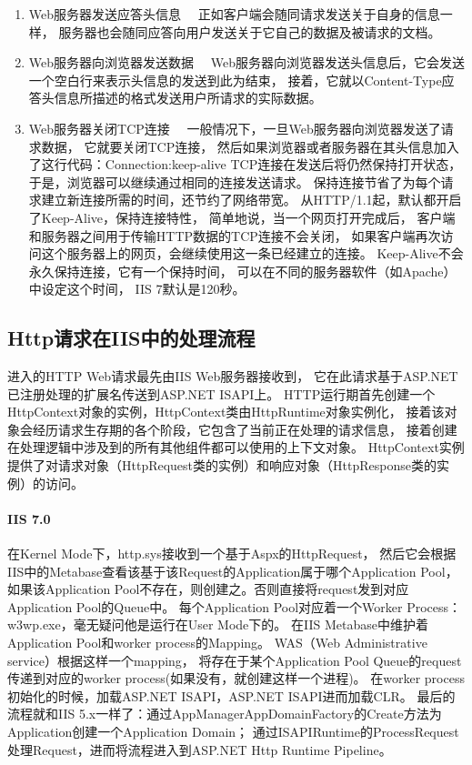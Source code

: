 \documentclass{book}
\begin{document}
\begin{enumerate}
\item{Web服务器发送应答头信息}~~
正如客户端会随同请求发送关于自身的信息一样，
服务器也会随同应答向用户发送关于它自己的数据及被请求的文档。

\item{Web服务器向浏览器发送数据}~~
Web服务器向浏览器发送头信息后，它会发送一个空白行来表示头信息的发送到此为结束，
接着，它就以Content-Type应答头信息所描述的格式发送用户所请求的实际数据。

\item{Web服务器关闭TCP连接}~~
一般情况下，一旦Web服务器向浏览器发送了请求数据，
它就要关闭TCP连接，
然后如果浏览器或者服务器在其头信息加入了这行代码：Connection:keep-alive
TCP连接在发送后将仍然保持打开状态，于是，浏览器可以继续通过相同的连接发送请求。
保持连接节省了为每个请求建立新连接所需的时间，还节约了网络带宽。
从HTTP/1.1起，默认都开启了Keep-Alive，保持连接特性，
简单地说，当一个网页打开完成后，
客户端和服务器之间用于传输HTTP数据的TCP连接不会关闭，
如果客户端再次访问这个服务器上的网页，会继续使用这一条已经建立的连接。
Keep-Alive不会永久保持连接，它有一个保持时间，
可以在不同的服务器软件（如Apache）中设定这个时间，
IIS 7默认是120秒。
\end{enumerate}


\subsection{Http请求在IIS中的处理流程}

进入的HTTP Web请求最先由IIS Web服务器接收到，
它在此请求基于ASP.NET已注册处理的扩展名传送到ASP.NET ISAPI上。
HTTP运行期首先创建一个HttpContext对象的实例，HttpContext类由HttpRuntime对象实例化，
接着该对象会经历请求生存期的各个阶段，它包含了当前正在处理的请求信息，
接着创建在处理逻辑中涉及到的所有其他组件都可以使用的上下文对象。
HttpContext实例提供了对请求对象（HttpRequest类的实例）和响应对象（HttpResponse类的实例）的访问。

\paragraph{IIS 7.0}
在Kernel Mode下，http.sys接收到一个基于Aspx的HttpRequest，
然后它会根据IIS中的Metabase查看该基于该Request的Application属于哪个Application Pool，
如果该Application Pool不存在，则创建之。否则直接将request发到对应Application Pool的Queue中。
每个Application Pool对应着一个Worker Process：w3wp.exe，毫无疑问他是运行在User Mode下的。
在IIS Metabase中维护着Application Pool和worker process的Mapping。
WAS（Web Administrative service）根据这样一个mapping，
将存在于某个Application Pool Queue的request 传递到对应的worker process(如果没有，就创建这样一个进程)。
在worker process初始化的时候，加载ASP.NET ISAPI，ASP.NET ISAPI进而加载CLR。
最后的流程就和IIS 5.x一样了：通过AppManagerAppDomainFactory的Create方法为Application创建一个Application Domain；
通过ISAPIRuntime的ProcessRequest处理Request，进而将流程进入到ASP.NET Http Runtime Pipeline。
\end{document}
